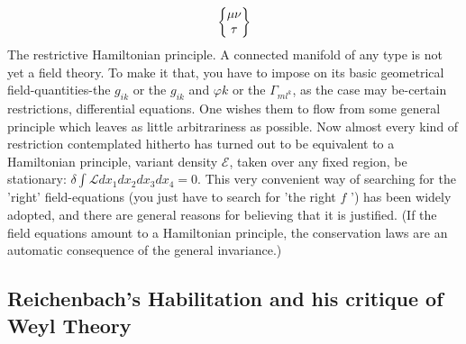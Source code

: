 \documentclass[draft]{article}
\begin{document}
{\begin{equation*}
\begin{Bmatrix} \mu \nu \\ \tau \end{Bmatrix}
\end{equation*}
%
The restrictive Hamiltonian principle. A connected manifold of any type is not yet a field theory. To make it that, you have to impose on its basic geometrical field-quantities-the $g_{i k}$ or the $g_{i k}$ and $\varphi k$ or the $\Gamma_{m l^{k}}$, as the case may be-certain restrictions, differential equations. One wishes them to flow from some general principle which leaves as little arbitrariness as possible. Now almost every kind of restriction contemplated hitherto has turned out to be equivalent to a Hamiltonian principle, variant density $\mathcal{E}$, taken over any fixed region, be stationary:
$\delta \int \mathcal{L} d x_{1} d x_{2} d x_{3} d x_{4}=0$. This very convenient way of searching for the 'right' field-equations (you just have to search for 'the right $f$ ') has been widely adopted, and there are general reasons for believing that it is justified. (If the field equations amount to a Hamiltonian principle, the conservation laws are an automatic consequence of the general invariance.)





\subsection{Reichenbach's Habilitation and his critique of Weyl Theory}

}
\end{document}
